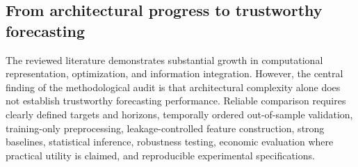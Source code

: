 \documentclass[pdflatex,sn-mathphys-num]{sn-jnl}%
\theoremstyle{thmstyleone}%
\theoremstyle{thmstyletwo}%
\theoremstyle{thmstylethree}%
\begin{document}



\subsection{From architectural progress to trustworthy forecasting}

The reviewed literature demonstrates substantial growth in computational
representation, optimization, and information integration. However, the
central finding of the methodological audit is that architectural complexity
alone does not establish trustworthy forecasting performance. Reliable
comparison requires clearly defined targets and horizons, temporally ordered
out-of-sample validation, training-only preprocessing, leakage-controlled
feature construction, strong baselines, statistical inference, robustness
testing, economic evaluation where practical utility is claimed, and
reproducible experimental specifications.
\end{document}
